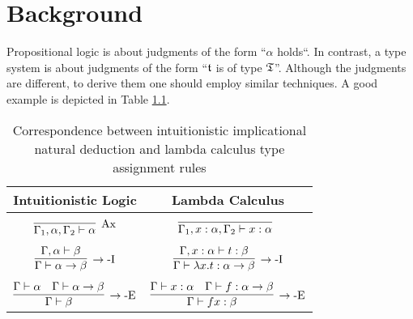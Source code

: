 \chapter{Background}\label{chap:background}

Propositional logic is about judgments of the form ``$\alpha$ holds``. In contrast, a type system is about judgments of the form ``$\mathfrak{t}$ is of type $\mathfrak{T}$''. Although the judgments are different, to derive them one should employ similar techniques. A good example is depicted in Table \ref{tab:natural-deduction-lambda-calculus-correspondence}.

\begin{table}[!ht]
    \centering
    \begin{tabular}{c|c}
        Intuitionistic Logic & Lambda Calculus \\
        \hline \\
        $\infer[\mbox{Ax}]{\Gamma_1, \alpha, \Gamma_2 \vdash \alpha}{}$ & $\infer[]{\Gamma_1, x : \alpha, \Gamma_2 \vdash x : \alpha}{}$ \\ \\
        $\infer[\rightarrow\mbox{-I}]{\Gamma \vdash \alpha \rightarrow \beta}{\Gamma, \alpha \vdash \beta}$ & $\infer[\rightarrow\mbox{-I}]{\Gamma \vdash \lambda x. t : \alpha \rightarrow \beta}{\Gamma, x : \alpha \vdash t : \beta}$ \\ \\
        $\infer[\rightarrow\mbox{-E}]{\Gamma \vdash \beta}{\Gamma \vdash \alpha & \Gamma \vdash \alpha \rightarrow \beta}$ & $\infer[\rightarrow\mbox{-E}]{\Gamma \vdash f x : \beta}{\Gamma \vdash x : \alpha & \Gamma \vdash f : \alpha \rightarrow \beta}$
    \end{tabular}
    \caption{Correspondence between 
intuitionistic implicational natural deduction and lambda calculus type assignment rules}
    \label{tab:natural-deduction-lambda-calculus-correspondence}
\end{table}